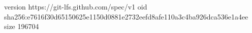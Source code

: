 version https://git-lfs.github.com/spec/v1
oid sha256:e7616f30d65150625e1150d0881e2732eefd8afe110a3c4ba926dca536e1a4ee
size 196704
